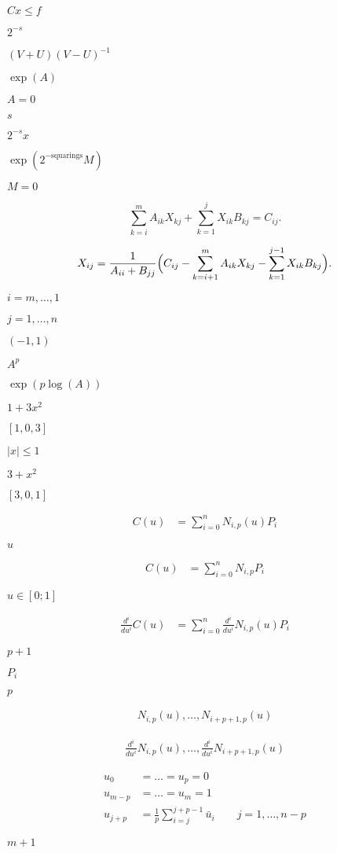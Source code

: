 \documentclass{article}
\begin{document}
$ Cx \le f $
\pagebreak

$ 2^{-s} $
\pagebreak

$ (V+U)(V-U)^{-1} $
\pagebreak

$ \exp(A) $
\pagebreak

$ A = 0 $
\pagebreak

$ s $
\pagebreak

$ 2^{-s} x $
\pagebreak

$ \exp(2^{-\mbox{squarings}}M) $
\pagebreak

$ M = 0 $
\pagebreak

\[ \sum_{k=i}^m A_{ik} X_{kj} + \sum_{k=1}^j X_{ik} B_{kj} = C_{ij}. \]
\pagebreak

\[ X_{ij} = \frac{1}{A_{ii} + B_{jj}} \Bigl( C_{ij} - \sum_{k=i+1}^m A_{ik} X_{kj} - \sum_{k=1}^{j-1} X_{ik} B_{kj} \Bigr). \]
\pagebreak

$ i=m,\ldots,1 $
\pagebreak

$ j=1,\ldots,n $
\pagebreak

$ (-1, 1) $
\pagebreak

$ A^p $
\pagebreak

$ \exp(p \log(A)) $
\pagebreak

$ 1 + 3x^2 $
\pagebreak

$ [ 1, 0, 3 ] $
\pagebreak

$ |x| \le 1 $
\pagebreak

$ 3 + x^2 $
\pagebreak

$ [ 3, 0, 1 ] $
\pagebreak

\begin{align*} C(u) & = \sum_{i=0}^{n}N_{i,p}(u)P_i \end{align*}
\pagebreak

$u$
\pagebreak

\begin{align*} C(u) & = \sum_{i=0}^{n}N_{i,p}P_i \end{align*}
\pagebreak

$u \in [0;1]$
\pagebreak

\begin{align*} \frac{d^i}{du^i}C(u) & = \sum_{i=0}^{n} \frac{d^i}{du^i} N_{i,p}(u)P_i \end{align*}
\pagebreak

$p+1$
\pagebreak

$P_i$
\pagebreak

$p$
\pagebreak

\begin{align*} N_{i,p}(u), \hdots, N_{i+p+1,p}(u) \end{align*}
\pagebreak

\begin{align*} \frac{d^i}{du^i} N_{i,p}(u), \hdots, \frac{d^i}{du^i} N_{i+p+1,p}(u) \end{align*}
\pagebreak

\begin{align*} u_0 & = \hdots = u_p = 0 \\ u_{m-p} & = \hdots = u_{m} = 1 \\ u_{j+p} & = \frac{1}{p}\sum_{i=j}^{j+p-1}\bar{u}_i \quad\quad j=1,\hdots,n-p \end{align*}
\pagebreak

$m+1$
\pagebreak
\end{document}
